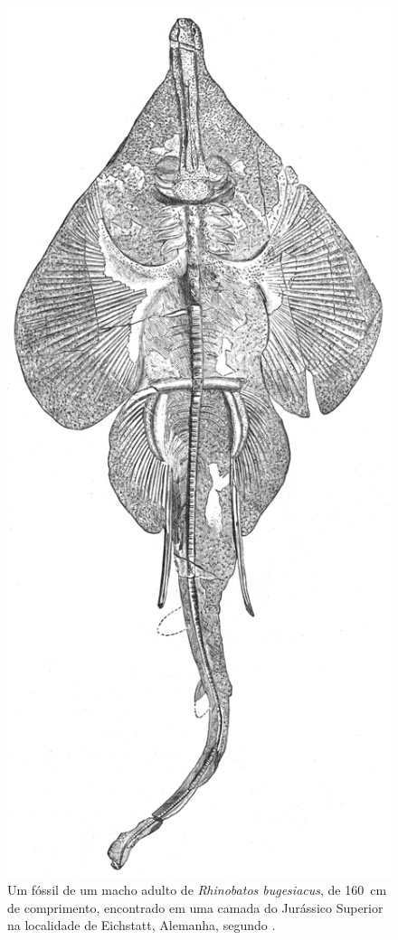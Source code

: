 \documentclass[a4paper,11pt,twoside,showtrims,onecolumn,openright,final]{memoir}
\begin{document}
\begin{figure}
\begin{center}
\includegraphics[height=0.8\textheight]{VIOLA_FOSSIL}
\end{center}
\caption[Fóssil de um macho adulto de \emph{Rhinobatos bugesiacus}]
	{Um fóssil de um macho adulto de \emph{Rhinobatos bugesiacus}, 
	 de 160~cm de comprimento, encontrado em uma camada do Jurássico 
	 Superior na localidade de Eichstatt, Alemanha, segundo \citet{abel1924}.} %
\label{fig:fossil-viola}
\end{figure}
\end{document}
